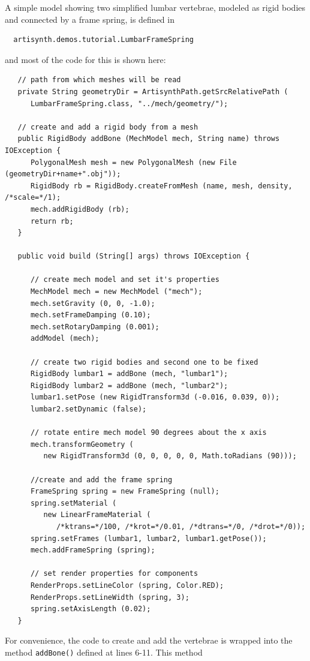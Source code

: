 A simple model showing two simplified lumbar vertebrae, modeled as
rigid bodies and connected by a frame spring, is defined in
%
\begin{verbatim}
  artisynth.demos.tutorial.LumbarFrameSpring
\end{verbatim}
%
and most of the code for this is shown here:
%
\lstset{numbers=left}
\begin{lstlisting}
   // path from which meshes will be read
   private String geometryDir = ArtisynthPath.getSrcRelativePath (
      LumbarFrameSpring.class, "../mech/geometry/");

   // create and add a rigid body from a mesh
   public RigidBody addBone (MechModel mech, String name) throws IOException {
      PolygonalMesh mesh = new PolygonalMesh (new File (geometryDir+name+".obj"));
      RigidBody rb = RigidBody.createFromMesh (name, mesh, density, /*scale=*/1);
      mech.addRigidBody (rb);
      return rb;
   }

   public void build (String[] args) throws IOException {

      // create mech model and set it's properties
      MechModel mech = new MechModel ("mech");
      mech.setGravity (0, 0, -1.0);
      mech.setFrameDamping (0.10);
      mech.setRotaryDamping (0.001);
      addModel (mech);

      // create two rigid bodies and second one to be fixed
      RigidBody lumbar1 = addBone (mech, "lumbar1");
      RigidBody lumbar2 = addBone (mech, "lumbar2");
      lumbar1.setPose (new RigidTransform3d (-0.016, 0.039, 0));
      lumbar2.setDynamic (false);

      // rotate entire mech model 90 degrees about the x axis
      mech.transformGeometry (
         new RigidTransform3d (0, 0, 0, 0, 0, Math.toRadians (90)));

      //create and add the frame spring
      FrameSpring spring = new FrameSpring (null);
      spring.setMaterial (
         new LinearFrameMaterial (
            /*ktrans=*/100, /*krot=*/0.01, /*dtrans=*/0, /*drot=*/0));
      spring.setFrames (lumbar1, lumbar2, lumbar1.getPose());
      mech.addFrameSpring (spring);

      // set render properties for components
      RenderProps.setLineColor (spring, Color.RED);
      RenderProps.setLineWidth (spring, 3);
      spring.setAxisLength (0.02);
   }
\end{lstlisting}
\lstset{numbers=none}
%
For convenience, the code to create and add the vertebrae is wrapped
into the method {\tt addBone()} defined at lines 6-11. This method
